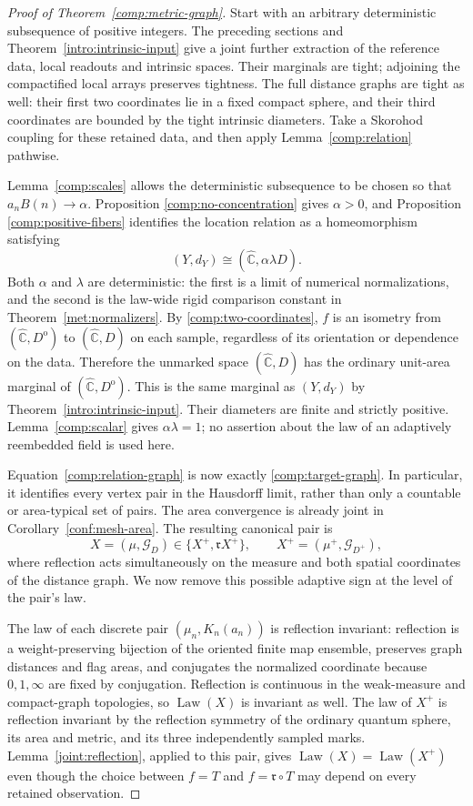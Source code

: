 \documentclass[11pt]{article}
\numberwithin{equation}{section}
\theoremstyle{definition}
\theoremstyle{remark}
\newcommand{\Chat}{\widehat{\mathbb C}}
\newcommand{\1}{\mathbf 1}
\DeclareMathOperator{\Law}{Law}
\begin{document}
\begin{proof}[Proof of Theorem~\ref{comp:metric-graph}]
Start with an arbitrary deterministic subsequence of positive
integers.  The preceding sections and
Theorem~\ref{intro:intrinsic-input} give a joint further extraction
of the reference data, local readouts and intrinsic spaces.
Their marginals are tight; adjoining the compactified local
arrays preserves tightness.  The full distance graphs are tight
as well: their first two coordinates lie in a fixed compact
sphere, and their third coordinates are bounded by the tight
intrinsic diameters.  Take a Skorohod coupling for these retained
data, and then apply Lemma~\ref{comp:relation} pathwise.

Lemma~\ref{comp:scales} allows the deterministic subsequence to
be chosen so that $a_nB(n)\to\alpha$.  Proposition
\ref{comp:no-concentration} gives $\alpha>0$, and Proposition
\ref{comp:positive-fibers} identifies the location relation as a
homeomorphism satisfying
\[
 (Y,d_Y)\cong(\Chat,\alpha\lambda D).
\]
Both $\alpha$ and $\lambda$ are deterministic: the first is a
limit of numerical normalizations, and the second is the
law-wide rigid comparison constant in
Theorem~\ref{met:normalizers}.  By
\eqref{comp:two-coordinates}, $f$ is an isometry from
$(\Chat,D^{\mathrm o})$ to $(\Chat,D)$ on each sample, regardless
of its orientation or dependence on the data.  Therefore the
unmarked space $(\Chat,D)$ has the ordinary unit-area marginal
of $(\Chat,D^{\mathrm o})$.  This is the same marginal as
$(Y,d_Y)$ by Theorem~\ref{intro:intrinsic-input}.  Their diameters
are finite and strictly positive.  Lemma~\ref{comp:scalar}
gives $\alpha\lambda=1$; no assertion about the law of an
adaptively reembedded field is used here.

Equation~\eqref{comp:relation-graph} is now exactly
\eqref{comp:target-graph}.  In particular, it identifies every
vertex pair in the Hausdorff limit, rather than only a countable
or area-typical set of pairs.  The area convergence is already
joint in Corollary~\ref{conf:mesh-area}.  The resulting canonical
pair is
\[
 X=(\mu,\mathcal G_D)
   \in\{X^+,\mathfrak r X^+\},\qquad
 X^+=(\mu^+,\mathcal G_{D^+}),
\]
where reflection acts simultaneously on the measure and both
spatial coordinates of the distance graph.  We now remove this
possible adaptive sign at the level of the pair's law.

The law of each discrete pair $(\mu_n,K_n(a_n))$ is reflection
invariant: reflection is a weight-preserving bijection of the
oriented finite map ensemble, preserves graph distances and
flag areas, and conjugates the normalized coordinate because
$0,1,\infty$ are fixed by conjugation.  Reflection is continuous
in the weak-measure and compact-graph topologies, so $\Law(X)$
is invariant as well.  The law of $X^+$ is reflection invariant
by the reflection symmetry of the ordinary quantum sphere,
its area and metric, and its three independently sampled marks.
Lemma~\ref{joint:reflection}, applied to this pair, gives
$\Law(X)=\Law(X^+)$ even though the choice between $f=T$ and
$f=\mathfrak r\circ T$ may depend on every retained observation.


\end{proof}
\end{document}
